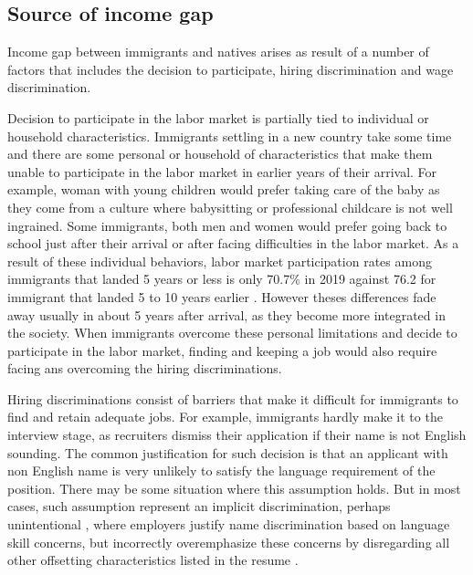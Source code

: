 \subsection{Source of income gap}

Income gap between immigrants and natives arises as result of a number of factors that includes the decision to participate, hiring discrimination and wage discrimination.

\vspace{0.7em}\par
Decision to participate in the labor market is partially tied to individual or household characteristics.
Immigrants settling in a new country take some time and there are some personal or household of characteristics that make them unable to participate in the labor market in earlier years of their arrival.
For example, woman with young children would prefer taking care of the baby as they come from a culture where babysitting or professional childcare is not well ingrained.
Some immigrants, both men and women would prefer going back to school just after their arrival or after facing difficulties in the labor market.
As a result of these individual behaviors, labor market participation rates among immigrants that landed 5 years or less is only 70.7\% in 2019 against 76.2 for immigrant that landed 5 to 10 years earlier \citep{statCan:002}.
However theses differences fade away usually in about 5 years after arrival, as they become more integrated in the society.
When immigrants overcome these personal limitations and decide to participate in the labor market, finding and keeping a job would also require facing ans overcoming the hiring discriminations.

\vspace{0.7em}\par
Hiring discriminations consist of barriers that make it difficult for immigrants to find and retain adequate jobs.
For example, immigrants hardly make it to the interview stage, as recruiters dismiss their application if their name is not English sounding.
The common justification for such decision is that an applicant with non English name is very unlikely to satisfy the language requirement of the position.
There may be some situation where this assumption holds.
But in most cases, such assumption represent an implicit discrimination, perhaps unintentional \citep{Crandall:wo,ROOTH2010523}, where employers justify name discrimination based on language skill concerns, but incorrectly overemphasize these concerns by disregarding all other offsetting characteristics listed in the resume \citep{Oreopoulos:2011jv}.

